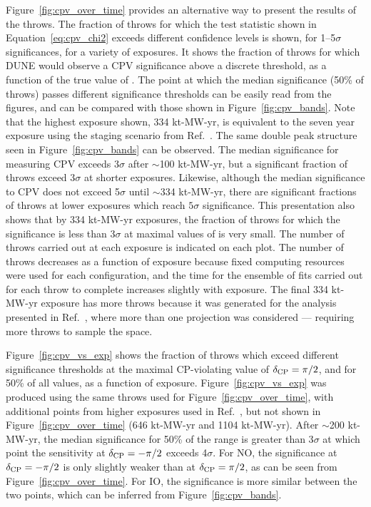 Figure~\ref{fig:cpv_over_time} provides an alternative way to present the results of the throws. The fraction of throws for which the test statistic shown in Equation~\ref{eq:cpv_chi2} exceeds different confidence levels is shown, for 1--5$\sigma$ significances, for a variety of exposures. It shows the fraction of throws for which DUNE would observe a CPV significance above a discrete threshold, as a function of the true value of \deltacp. The point at which the median significance (50\% of throws) passes different significance thresholds can be easily read from the figures, and can be compared with those shown in Figure~\ref{fig:cpv_bands}. Note that the highest exposure shown, 334 kt-MW-yr, is equivalent to the seven year exposure using the staging scenario from Ref.~\cite{Abi:2020qib}. The same double peak structure seen in Figure~\ref{fig:cpv_bands} can be observed. The median significance for measuring CPV exceeds 3$\sigma$ after $\sim$100 kt-MW-yr, but a significant fraction of throws exceed 3$\sigma$ at shorter exposures. Likewise, although the median significance to CPV does not exceed 5$\sigma$ until $\sim$334 kt-MW-yr, there are significant fractions of throws at lower exposures which reach $5\sigma$ significance. This presentation also shows that by 334 kt-MW-yr exposures, the fraction of throws for which the significance is less than 3$\sigma$ at maximal values of \deltacp is very small. The number of throws carried out at each exposure is indicated on each plot. The number of throws decreases as a function of exposure because fixed computing resources were used for each configuration, and the time for the ensemble of fits carried out for each throw to complete increases slightly with exposure. The final 334 kt-MW-yr exposure has more throws because it was generated for the analysis presented in Ref.~\cite{Abi:2020qib}, where more than one projection was considered --- requiring more throws to sample the space.

Figure~\ref{fig:cpv_vs_exp} shows the fraction of throws which exceed different significance thresholds at the maximal CP-violating value of $\delta_{\rm CP} = \pi/2$, and for 50\% of all \deltacp values, as a function of exposure. Figure~\ref{fig:cpv_vs_exp} was produced using the same throws used for Figure~\ref{fig:cpv_over_time}, with additional points from higher exposures used in Ref.~\cite{Abi:2020qib}, but not shown in Figure~\ref{fig:cpv_over_time} (646 kt-MW-yr and 1104 kt-MW-yr). After $\sim$200 kt-MW-yr, the median significance for 50\% of the \deltacp range is greater than 3$\sigma$ at which point the sensitivity at $\delta_{\rm CP} = -\pi/2$ exceeds 4$\sigma$. For NO, the significance at $\delta_{\rm CP} = -\pi/2$ is only slightly weaker than at $\delta_{\rm CP} = \pi/2$, as can be seen from Figure~\ref{fig:cpv_over_time}. For IO, the significance is more similar between the two points, which can be inferred from Figure~\ref{fig:cpv_bands}.

